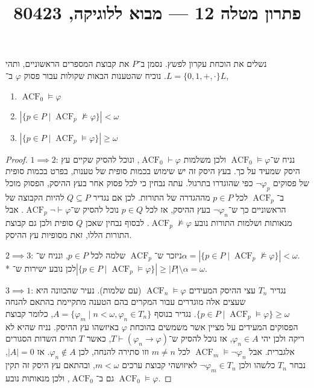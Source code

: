 
\title{פתרון מטלה 12 --- מבוא ללוגיקה, 80423}


\maketitle
\maketitleprint{}

\question{}
נשלים את הוכחת עקרון לפשץ.
נסמן ב־$P$ את קבוצת המספרים הראשוניים, ותהי $L = \{ 0, 1, +, \cdot \}$.
נוכיח שהטענות הבאות שקולות עבור פסוק $\varphi$ ב־$L$,
\begin{enumerate}
	\item $\operatorname{ACF}_0 \models \varphi$
	\item $|\{ p \in P \mid \operatorname{ACF}_p \not\models \varphi \}| < \omega$
	\item $|\{ p \in P \mid \operatorname{ACF}_p \models \varphi \}| \ge \omega$
\end{enumerate}
\begin{proof}
	$1 \implies 2$:
	נניח ש־$\operatorname{ACF}_0 \models \varphi$ ולכן משלמות $\operatorname{ACF}_0 \vdash \varphi$, ונוכל להסיק שקיים עץ היסק שמעיד על כך.
	בעץ היסק זה יש שימוש בכמות סופית של טענות, בפרט בכמות סופית של פסוקים $\lnot \varphi_p$ כפי שהוגדרו בתרגול.
	עתה נבחין כי לכל פסוק אחר בעץ ההיסק, הפסוק מוכל ב־$\operatorname{ACF}_p$ לכל $p \in P$ מההגדרה של התורות.
	לכן אם נגדיר $Q \subseteq P$ להיות הקבוצה של הראשוניים כך ש־$\lnot \varphi_n$ בעץ ההיסק, אז לכל $p \in Q$ נוכל להסיק ש־$\operatorname{ACF}_p \lnot\vdash \varphi$.
	אבל מנאותות ושלמות התורות נובע $\operatorname{ACF}_p \not\models \varphi$. לבסוף נבחין שאכן $Q$ סופית ולכן גם קבוצת התורות הללו, זאת מסופיות עץ ההיסק.

	$2 \implies 3$:
	ניזכר ש־$\operatorname{ACF}_p$ שלמה לכל $p \in P$, ונניח ש־$\alpha = |\{ p \in P \mid \operatorname{ACF}_p \not\models \varphi \}| < \omega$. \\*
	לכן נובע ישירות ש־$|\{ p \in P \mid \operatorname{ACF}_p \models \varphi \}| \ge |P| \setminus \alpha = \omega$.

	$3 \implies 1$:
	נגדיר $T_n$ עצי ההיסק המעידים $\operatorname{ACF}_n \models \varphi$ (עם שלמות).
	נעיר שהכוונה היא שעצים אלה מוגדרים עבור המקרים בהם הטענה מתקיימת בהתאם להנחה $\{ p \in P \mid \operatorname{ACF}_p \models \varphi \} \ge \omega$.
	נגדיר בנוסף $A = \{ \varphi_m \mid n < \omega, \varphi_n \in T_n \}$, כלומר קבוצת הפסוקים המעידים על מציין אשר משמשים בהוכחת $\varphi$ באיזשהו עץ ההיסק.
	נניח שהיא לא ריקה ולכן יהי $\varphi_n \in A$, אז נוכל להסיק ש־$T \vdash (\varphi_n \to \varphi)$, כאשר $T$ תורת השדות הסגורים אלגברית.
	אבל $\operatorname{ACF}_m \models \lnot \varphi_n$ לכל $m \ne n$ וזו סתירה להנחה, לכן $\varphi_n \notin A$.
	אז $|A| = 0$, נבחר $T_n$ כלשהו ולכן $\lnot \varphi_m \in T_n$ לאיזושהי קבוצת ערכים $m < \omega$, ובהתאם עץ היסק זה תקין גם ב־$\operatorname{ACF}_0$, ולכן מנאותות נובע $\operatorname{ACF}_0 \models \varphi$.
\end{proof}

